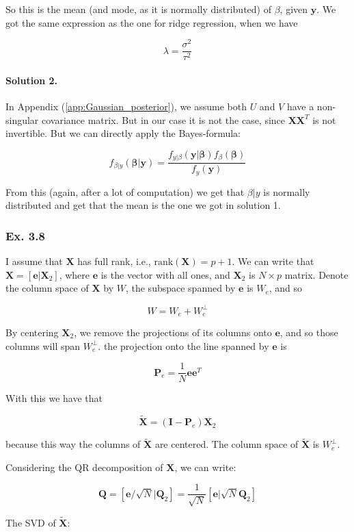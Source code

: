 \documentclass{article}
\begin{document}
So this is the mean (and mode, as it is normally distributed) of $\beta$, given $\mathbf{y}$. We got the same expression as the one for ridge regression, when we have

\[
\lambda = \frac{\sigma^2}{\tau^2}
\]

\paragraph{Solution 2.} In Appendix (\ref{app:Gaussian_posterior}), we assume both $U$ and $V$ have a non-singular covariance matrix. But in our case it is not the case, since $\bm{X}\bm{X}^T$ is not invertible. But we can directly apply the Bayes-formula:

\[
f_{\beta|y}(\bm{\beta}|\bm{y}) = \frac{f_{y|\beta}(\bm{y}|\bm{\beta}) f_{\beta}(\bm{\beta})}{f_{y}(\bm{y})}
\]

From this (again, after a lot of computation) we get that $\beta|y$ is normally distributed and get that the mean is the one we got in solution 1.

\subsubsection{Ex. 3.8}

I assume that $\bm{X}$ has full rank, i.e., $\text{rank}(\bm{X}) = p+1$. We can write that $\bm{X} = [\bm{e} | \bm{X}_2]$, where $\bm{e}$ is the vector with all ones, and $\bm{X}_2$ is $N\times p$ matrix. Denote the column space of $\bm{X}$ by $W$, the subspace spanned by $\bm{e}$ is $W_e$, and so

\[
W = W_e + W_e^{\perp}
\]

By centering $\bm{X}_2$, we remove the projections of its columns onto $\bm{e}$, and so those columns will span $W_e^{\perp}$. the projection onto the line spanned by $\bm{e}$ is

\[
\bm{P}_e = \frac1N \bm{e}\bm{e}^T
\]

With this we have that

\[
\tilde{\bm{X}} = (\bm{I} - \bm{P}_e) \bm{X}_2
\]

because this way the columns of $\tilde{\bm{X}}$ are centered. The column space of $\tilde{\bm{X}}$ is $W_e^{\perp}$.

Considering the QR decomposition of $\bm{X}$, we can write:

\[
\bm{Q} = [\bm{e}/\sqrt{N} | \bm{Q}_2] = \frac{1}{\sqrt{N}} [\bm{e} | \sqrt{N} \bm{Q}_2]
\]

The SVD of $\tilde{\bm{X}}$:
\end{document}
